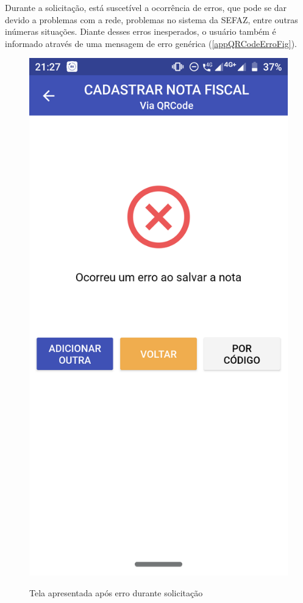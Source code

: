 \newpage
Durante a solicitação, está suscetível a ocorrência de erros, que pode se dar devido a problemas com a rede, problemas no sistema da SEFAZ, entre outras inúmeras situações. Diante desses erros inesperados, o usuário também é informado através de uma mensagem de erro genérica (\autoref{appQRCodeErroFig}).

\begin{figure}[h]
    \centering
    \caption{Tela apresentada após erro durante solicitação}
    \includegraphics[scale=0.15]{tcc/figures/app/app_codigo_qrcode_erro.png}
    \label{appQRCodeErroFig}
\end{figure}

